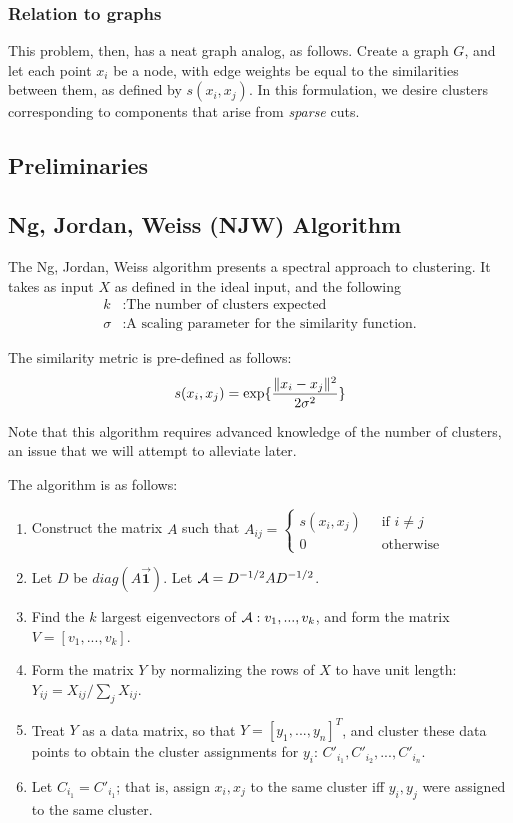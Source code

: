 \subsubsection{Relation to graphs}
This problem, then, has a neat graph analog, as follows. Create a graph $G$, and
let each point $x_i$ be a node, with edge weights be equal to the
similarities between them, as defined by $s(x_i, x_j)$. In this formulation, we
desire clusters corresponding to components that arise from \textit{sparse}
cuts.

\subsection{Preliminaries}
%

\subsection{Ng, Jordan, Weiss (NJW) Algorithm}
The Ng, Jordan, Weiss algorithm presents a spectral approach to clustering. It
takes as input $X$ as defined in the ideal input, and the following
\begin{align*}
    k &: \text{The number of clusters expected} \\
    \sigma &: \text{A scaling parameter for the similarity function.}
\end{align*}

The similarity metric is pre-defined as follows:
\begin{align*}
    s(x_i, x_j) = \exp\{\frac{\lVert x_i - x_j\rVert^2}{2\sigma^2}\}
\end{align*}

Note that this algorithm requires advanced knowledge of the number of clusters,
an issue  that we will attempt to alleviate later.

The algorithm is as follows:
\begin{enumerate}
    \item Construct the matrix $A$ such that $A_{ij} = \begin{cases}s(x_i, x_j) &\;\text{ if } i \neq j \\
                                                                    0           &\;\text{ otherwise}\end{cases}$
    \item Let $D$ be $diag(A \vec{\mathbf{1}})$. Let $\mathcal{A} = D^{-1/2} A D^{-1/2}$.
    \item Find the $k$ largest eigenvectors of $\mathcal{A}: v_1,...,v_k$, and form the
            matrix $V = [v_1, ..., v_k]$.
    \item Form the matrix $Y$ by normalizing the rows of $X$ to have unit length:
            $Y_{ij} = X_{ij} / \sum_j X_{ij}$.
    \item Treat $Y$ as a data matrix, so that $Y = [y_1, ..., y_n]^T$, and
        cluster these data points to obtain the cluster assignments for $y_i$:
        $C'_{i_1}, C'_{i_2}, ..., C'_{i_n}$.
    \item Let $C_{i_1} = C'_{i_1}$; that is, assign $x_i, x_j$ to the same cluster
        iff $y_i, y_j$ were assigned to the same cluster.
\end{enumerate}

